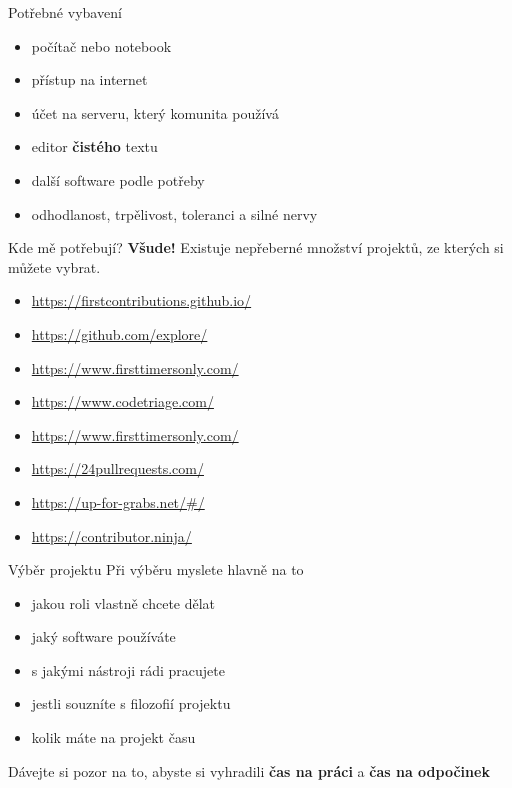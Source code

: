 \documentclass[11pt]{beamer}
\begin{document}
 \begin{frame}{Potřebné vybavení}
	\begin{itemize}
		\item počítač nebo notebook
		\item přístup na internet
		\item účet na serveru, který komunita používá
		\item editor \textbf{čistého} textu
		\item další software podle potřeby
		\item odhodlanost, trpělivost, toleranci a silné nervy
	\end{itemize}
\end{frame}

 \begin{frame}{Kde mě potřebují?}
 	\textbf{Všude!} Existuje nepřeberné množství projektů, ze kterých si můžete vybrat.
 	
	\begin{itemize}
		\item \url{https://firstcontributions.github.io/}
		\item \url{https://github.com/explore/}
		\item \url{https://www.firsttimersonly.com/}
		\item \url{https://www.codetriage.com/}
		\item \url{https://www.firsttimersonly.com/}
		\item \url{https://24pullrequests.com/}
		\item \url{https://up-for-grabs.net/\#/}
		\item \url{https://contributor.ninja/}
	\end{itemize}
\end{frame}

\begin{frame}{Výběr projektu}
	Při výběru myslete hlavně na to
	\begin{itemize}
		\item jakou roli vlastně chcete dělat
		\item jaký software používáte
		\item s jakými nástroji rádi pracujete
		\item jestli souzníte s filozofií projektu
		\item kolik máte na projekt času
	\end{itemize}
	Dávejte si pozor na to, abyste si vyhradili \textbf{čas na práci} a \textbf{čas na odpočinek}
\end{frame}
\end{document}
